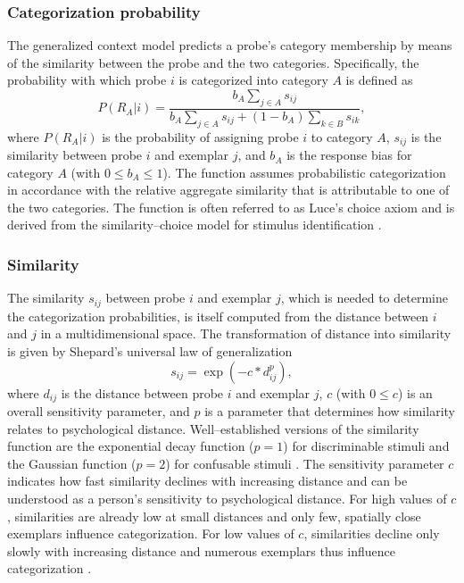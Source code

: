 \documentclass[a4paper,man,natbib]{apa6}
\begin{document}
\subsubsection{Categorization probability}
The generalized context model \citep{nosofsky1989further} predicts a probe's category membership by means of the similarity between the probe and the two categories. Specifically, the probability with which probe $i$ is categorized into category $A$ is defined as 
\begin{equation}
P(R_{A}|i) = \frac{b_{A}\sum\limits_{j \in A} s_{ij}}{b_{A}\sum\limits_{j \in A} s_{ij} + (1 - b_{A})\sum\limits_{k \in B} s_{ik}},
\label{eq:probability}
\end{equation}
where $P(R_{A}|i)$ is the probability of assigning probe $i$ to category $A$, $s_{ij}$ is the similarity between probe $i$ and exemplar $j$, and $b_{A}$ is the response bias for category $A$ (with $0 \leq b_{A} \leq 1$). The function assumes probabilistic categorization in accordance with the relative aggregate similarity that is attributable to one of the two categories. The function is often referred to as Luce's choice axiom \citep{luce1959individual} and is derived from the similarity--choice model for stimulus identification \citep{luce1963detection, shepard1957stimulus}. 

\subsubsection{Similarity}
The similarity $s_{ij}$ between probe $i$ and exemplar $j$, which is needed to determine the categorization probabilities, is itself computed from the distance between $i$ and $j$ in a multidimensional space. The transformation of distance into similarity is given by Shepard's universal law of generalization \citep{shepard1987toward}
\begin{equation}
s_{ij} = \exp\left(-c*d_{ij}^p\right),
\label{eq:similarity}
\end{equation}
where $d_{ij}$ is the distance between probe $i$ and exemplar $j$, $c$ (with $0 \leq c$) is an overall sensitivity parameter, and $p$ is a parameter that determines how similarity relates to psychological distance. Well--established versions of the similarity function are the exponential decay function ($p = 1$) for discriminable stimuli and the Gaussian function ($p = 2$) for confusable stimuli \citep{ennis1988confusable, nosofsky1985luce}. The sensitivity parameter $c$ indicates how fast similarity declines with increasing distance and can be understood as a person's sensitivity to psychological distance. For high values of $c$, similarities are already low at small distances and only few, spatially close exemplars influence categorization. For low values of $c$, similarities decline only slowly with increasing distance and numerous exemplars thus influence categorization \citep{nosofsky2011generalized}.
\end{document}
